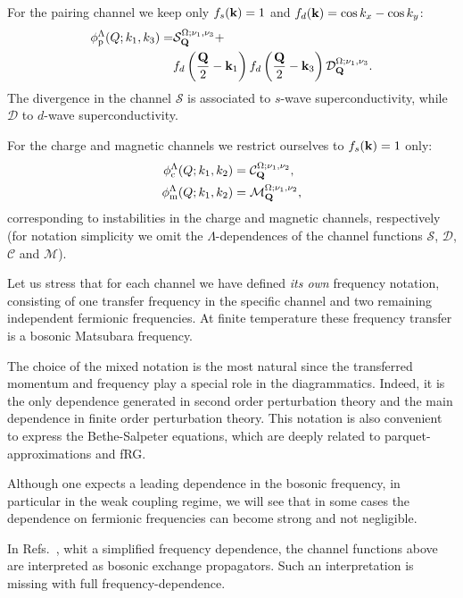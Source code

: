 For the pairing channel we keep only $f_{s}(\mathbf{k}) = 1$ and $f_d(\mathbf{k})=\cos{k_x} - \cos{k_y}$:
\begin{align}
\nonumber
  \phi^{\Lambda}_{\mathrm{p}}(Q;k_1,k_3) =&
    \mathcal{S}_{\mathbf{Q}}^{\Omega;\nu_1,\nu_3} +   \\ 
    & f_d\left(\frac{\mathbf{Q}}{2}-\mathbf{k}_1\right) f_d\left(\frac{\mathbf{Q}}{2}-\mathbf{k}_3\right) \mathcal{D}_{\mathbf{Q}}^{\Omega;\nu_1,\nu_3}.
\end{align}
The divergence in the channel $\mathcal{S}$ is associated to $s$-wave superconductivity, while $\mathcal{D}$  to $d$-wave superconductivity.\cite{Metzner2012,Platt2014}

For the charge and magnetic channels we restrict ourselves to $f_{s}(\mathbf{k})=1$ only:
\begin{align}
  \phi^\Lambda_{\mathrm{c}}(Q;k_1,k_2) &= \mathcal{C}_{\mathbf{Q}}^{\Omega;\nu_1,\nu_2}, \\
  \phi^\Lambda_{\mathrm{m}}(Q;k_1,k_2) &= \mathcal{M}_{\mathbf{Q}}^{\Omega;\nu_1,\nu_2},
\end{align}
corresponding to instabilities in the charge and magnetic channels, respectively (for notation simplicity we omit 
the $\Lambda$-dependences of the channel functions $\mathcal{S}$, $\mathcal{D}$, $\mathcal{C}$ and $\mathcal{M}$).

Let us stress that for each channel we have defined \textit{its own} frequency notation, consisting of one transfer frequency in the specific channel 
and two remaining independent fermionic frequencies. 
 At finite temperature these frequency transfer is a bosonic Matsubara frequency.

\noindent
The choice of the mixed notation is the most natural\cite{Wentzell2017} since the transferred momentum and 
frequency play a special role in the diagrammatics.
Indeed, it is the only dependence generated in second order perturbation theory and the main dependence in finite 
order perturbation theory. This notation is also convenient to express the Bethe-Salpeter equations\cite{Rohringer2012}, which are deeply related to parquet-approximations and fRG. 

Although one expects a leading dependence in the bosonic frequency, 
in particular in the weak coupling regime, we will see that in some cases the dependence on fermionic frequencies can become strong and not negligible.

In Refs.~, whit a simplified frequency dependence, the channel functions above are interpreted as bosonic exchange propagators. Such an interpretation is missing with full frequency-dependence.

